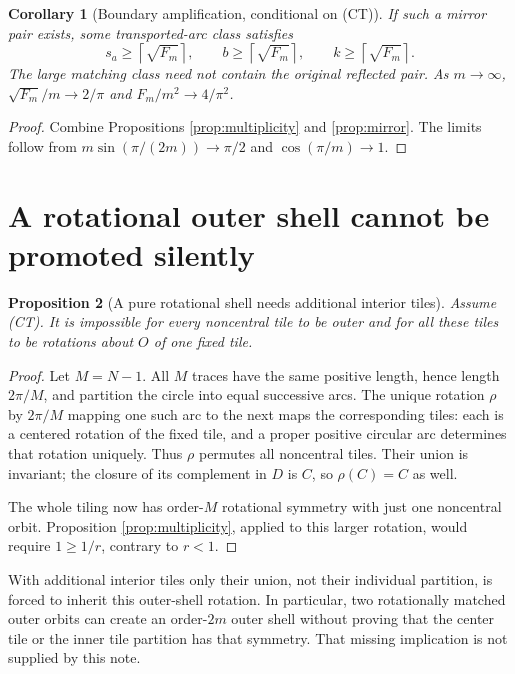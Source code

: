 \documentclass[11pt]{article}
\newtheorem{proposition}{Proposition}
\newtheorem{corollary}[proposition]{Corollary}
\begin{document}
\begin{corollary}[Boundary amplification, conditional on (CT)]
\label{cor:amplification}
If such a mirror pair exists, some transported-arc class satisfies
\[
 s_a\geq\left\lceil\sqrt{F_m}\right\rceil,
 \qquad b\geq\left\lceil\sqrt{F_m}\right\rceil,
 \qquad k\geq\left\lceil\sqrt{F_m}\right\rceil.
\]
The large matching class need not contain the original reflected pair.
As $m\to\infty$, $\sqrt{F_m}/m\to2/\pi$ and
$F_m/m^2\to4/\pi^2$.
\end{corollary}

\begin{proof}
Combine Propositions \ref{prop:multiplicity} and \ref{prop:mirror}.
The limits follow from $m\sin(\pi/(2m))\to\pi/2$ and
$\cos(\pi/m)\to1$.
\end{proof}

\section{A rotational outer shell cannot be promoted silently}

\begin{proposition}[A pure rotational shell needs additional interior tiles]
\label{prop:shell}
Assume (CT). It is impossible for every noncentral tile to be outer and
for all these tiles to be rotations about $O$ of one fixed tile.
\end{proposition}

\begin{proof}
Let $M=N-1$. All $M$ traces have the same positive length, hence length
$2\pi/M$, and partition the circle into equal successive arcs. The unique
rotation $\rho$ by $2\pi/M$ mapping one such arc to the next maps the
corresponding tiles: each is a centered rotation of the fixed tile, and a
proper positive circular arc determines that rotation uniquely.
Thus $\rho$ permutes all noncentral tiles. Their union is invariant; the
closure of its complement in $D$ is $C$, so $\rho(C)=C$ as well.

The whole tiling now has order-$M$ rotational symmetry with just one
noncentral orbit. Proposition \ref{prop:multiplicity}, applied to this
larger rotation, would require $1\geq1/r$, contrary to $r<1$.
\end{proof}

With additional interior tiles only their union, not their individual
partition, is forced to inherit this outer-shell rotation. In particular,
two rotationally matched outer orbits can create an order-$2m$ outer shell
without proving that the center tile or the inner tile partition has that
symmetry. That missing implication is not supplied by this note.
\end{document}
